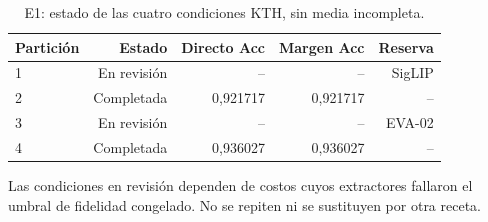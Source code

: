 \begin{table}[!htbp]\centering
\fontsize{8}{10}\selectfont\setlength{\tabcolsep}{4pt}
\caption{E1: estado de las cuatro condiciones KTH, sin media incompleta.}\label{tab:e1-kth-state}
\begin{tabular}{@{}lrrrr@{}}\toprule
Partición & Estado & Directo Acc & Margen Acc & Reserva\\\midrule
1 & En revisión & -- & -- & SigLIP\\
2 & Completada & 0,921717 & 0,921717 & --\\
3 & En revisión & -- & -- & EVA-02\\
4 & Completada & 0,936027 & 0,936027 & --\\
\bottomrule\end{tabular}
\par\smallskip\begin{minipage}{0.98\textwidth}\footnotesize Las condiciones en revisión dependen de costos cuyos extractores fallaron el umbral de fidelidad congelado. No se repiten ni se sustituyen por otra receta.\end{minipage}
\end{table}
